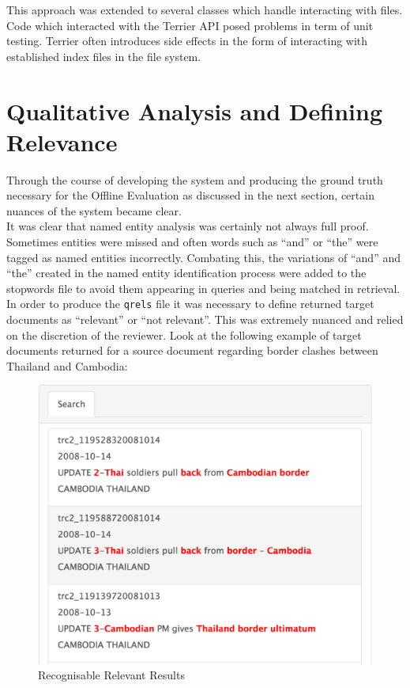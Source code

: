 \documentclass{l4proj}
\newcommand{\code}[1]{\texttt{#1}}
\begin{document}
This approach was extended to several classes which handle interacting with files.
Code which interacted with the Terrier API posed problems in term of unit testing. Terrier often introduces side effects in the form of interacting with established index files in the file system.
\section{Qualitative Analysis and Defining Relevance}
Through the course of developing the system and producing the ground truth necessary for the Offline Evaluation as discussed in the next section, certain nuances of the system became clear. \\
It was clear that named entity analysis was certainly not always full proof. Sometimes entities were missed and often words such as ``and'' or ``the'' were tagged as named entities incorrectly. Combating this, the variations of ``and'' and ``the'' created in the named entity identification process were added to the stopwords file to avoid them appearing in queries and being matched in retrieval. \\
In order to produce the \code{qrels} file it was necessary to define returned target documents as ``relevant'' or ``not relevant''. This was extremely nuanced and relied on the discretion of the reviewer. Look at the following example of target documents returned for a source document regarding border clashes between Thailand and Cambodia:
\begin{figure}[H]
\centering
\includegraphics[scale=0.30]{images/good_results}
\caption{Recognisable Relevant Results}
\label{relevant_results}
\end{figure}
\end{document}
